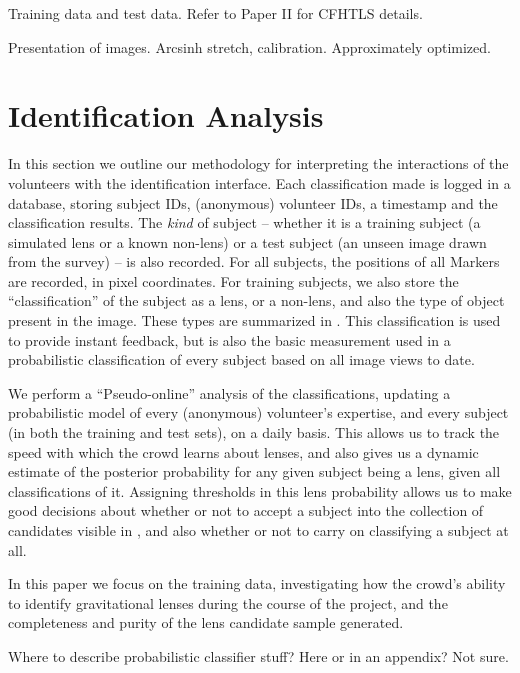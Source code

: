 \documentclass[useAMS,usenatbib,a4paper]{mn2e}
\begin{document}
Training data and test data. Refer to Paper II for CFHTLS details.

Presentation of images. Arcsinh stretch, calibration. Approximately
optimized.



\section{Identification Analysis}
\label{sec:IDanalysis}

In this section we outline our methodology for interpreting the
interactions of the volunteers with the identification interface.  Each
classification made is logged in a database, storing subject IDs,
(anonymous) volunteer IDs, a timestamp and the classification results. 
The {\it kind} of subject -- whether it is a training subject (a 
simulated lens or a known non-lens) or a test subject (an unseen image
drawn from the survey) -- is also recorded. For all subjects, the
positions of all Markers are recorded, in pixel coordinates. For
training subjects, we also store the ``classification'' of the subject
as a lens, or a non-lens, and also the type of object present in the
image. These types are summarized in . 
This classification is used to provide instant feedback, but is also the
basic measurement used in a probabilistic classification of every
subject based on all image views to date.

We perform a ``Pseudo-online'' analysis of the classifications, 
updating a probabilistic model of every (anonymous) volunteer's
expertise, and every subject (in both the training and test sets), on a
daily basis. This allows us to track the speed with which the crowd
learns about lenses, and also gives us a dynamic estimate of the
posterior probability for  any given  subject being a lens, given all
classifications of it. Assigning thresholds in this lens probability
allows us to make good decisions about whether or not to accept a
subject into the collection of candidates visible in \Talk, and also
whether or not to  carry on classifying a subject at all. 

In this paper we focus on the training data,  investigating  how the 
crowd's ability to identify gravitational lenses during the course of
the project, and the completeness and purity of the lens candidate
sample generated.

Where to describe probabilistic classifier stuff? Here or in an
appendix? Not sure.
\end{document}
